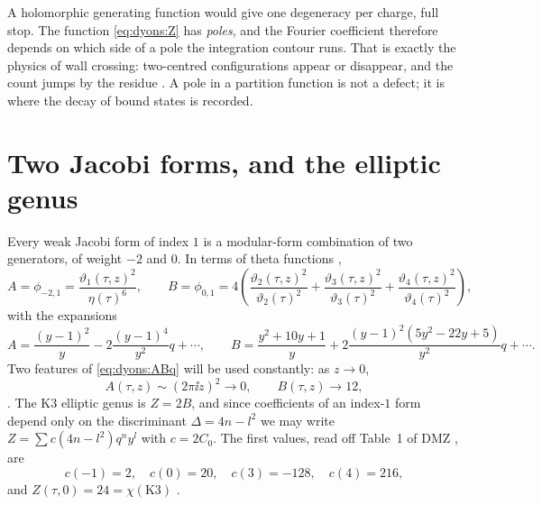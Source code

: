 \begin{physicsbox}
A holomorphic generating function would give one degeneracy per charge, full stop. The
function \eqref{eq:dyons:Z} has \emph{poles}, and the Fourier coefficient therefore depends on
which side of a pole the integration contour runs. That is exactly the physics of wall
crossing: two-centred configurations appear or disappear, and the count jumps by the residue
. A pole in a partition function is not a defect; it is where
the decay of bound states is recorded.
\end{physicsbox}

\section{Two Jacobi forms, and the elliptic genus}\label{sec:dyons:AB}

Every weak Jacobi form of index $1$ is a modular-form combination of two generators, of weight
$-2$ and $0$. In terms of theta functions ,
\begin{equation}\label{eq:dyons:ABtheta}
  A=\phi_{-2,1}=\frac{\vartheta_1(\tau,z)^2}{\eta(\tau)^6},
  \qquad
  B=\phi_{0,1}=4\left(\frac{\vartheta_2(\tau,z)^2}{\vartheta_2(\tau)^2}
   +\frac{\vartheta_3(\tau,z)^2}{\vartheta_3(\tau)^2}
   +\frac{\vartheta_4(\tau,z)^2}{\vartheta_4(\tau)^2}\right),
\end{equation}
with the expansions 
\begin{equation}\label{eq:dyons:ABq}
  A=\frac{(y-1)^2}{y}-2\frac{(y-1)^4}{y^2}q+\cdots,
  \qquad
  B=\frac{y^2+10y+1}{y}+2\frac{(y-1)^2(5y^2-22y+5)}{y^2}q+\cdots .
\end{equation}
Two features of \eqref{eq:dyons:ABq} will be used constantly: as $z\to0$,
\begin{equation}\label{eq:dyons:ABlimits}
  A(\tau,z)\sim(2\pi\ii z)^2\longrightarrow 0,
  \qquad
  B(\tau,z)\longrightarrow 12 ,
\end{equation}
. The K3 elliptic genus is $Z=2B$, and since coefficients of
an index-$1$ form depend only on the discriminant $\Delta=4n-l^2$ we may write
$Z=\sum c(4n-l^2)q^ny^l$ with $c=2C_0$. The first values, read off Table~1 of DMZ
, are
\begin{equation}\label{eq:dyons:cvalues}
  c(-1)=2,\quad c(0)=20,\quad c(3)=-128,\quad c(4)=216,
\end{equation}
and $Z(\tau,0)=24=\chi(\mathrm{K3})$ .

